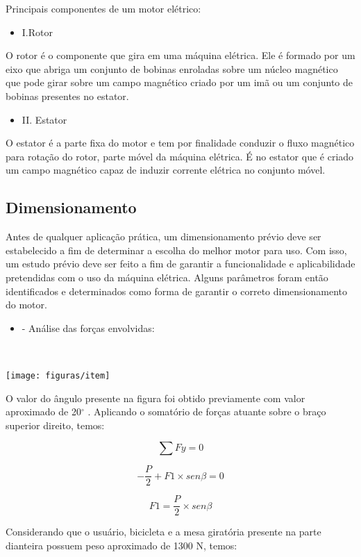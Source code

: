 Principais componentes de um motor elétrico: 

\begin{itemize}
\item 
I.Rotor
\end{itemize}
O rotor é o componente que gira em uma máquina elétrica. Ele é formado por um eixo que abriga um conjunto de bobinas enroladas sobre um núcleo magnético que pode girar sobre um campo magnético criado por um imã ou um conjunto de bobinas presentes no estator.
\begin{itemize}
\item 
II. Estator
\end{itemize}
O estator é a parte fixa do motor e tem por finalidade conduzir o fluxo magnético para rotação do rotor, parte móvel da máquina elétrica. É no estator que é criado um campo magnético capaz de induzir corrente elétrica no conjunto móvel.     

\subsection{Dimensionamento}

Antes de qualquer aplicação prática, um dimensionamento prévio deve ser estabelecido a fim de determinar a escolha do melhor motor para uso. Com isso, um estudo prévio deve ser feito a fim de garantir a funcionalidade e aplicabilidade pretendidas com o uso da máquina elétrica. Alguns parâmetros foram então identificados e determinados como forma de garantir o correto dimensionamento do motor.

\begin{itemize}
\item 
- Análise das forças envolvidas: 
\end{itemize}
                                                          
\begin{center}
\texttt{[image: figuras/item]}
\label{item}
\end{center}

O valor do ângulo \beta presente na figura foi obtido previamente com valor aproximado de 20$^{\circ}$ . Aplicando o somatório de forças atuante sobre o braço superior direito, temos:

\[\sum Fy= 0\]

\[- \frac{P}{2} + F1\times  sen \beta  =  0\]

\[F1 = \frac{P}{2} \times sen \beta\]

Considerando que o usuário, bicicleta e a mesa giratória presente na parte dianteira possuem peso aproximado de 1300 N, temos: 

